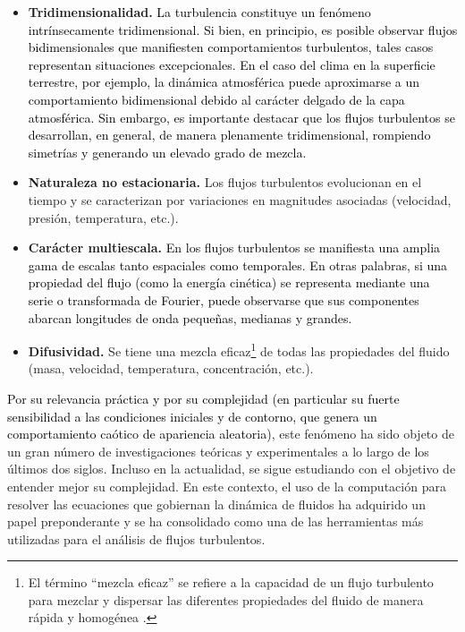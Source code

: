 \begin{itemize}
	
	
	
\item \textbf{Tridimensionalidad.} \textcolor{black}{La turbulencia constituye un fenómeno intrínsecamente tridimensional. Si bien, en principio, es posible observar flujos bidimensionales que manifiesten comportamientos turbulentos, tales casos representan situaciones excepcionales. En el caso del clima en la superficie terrestre, por ejemplo, la dinámica atmosférica puede aproximarse a un comportamiento bidimensional debido al carácter delgado de la capa atmosférica. Sin embargo, es importante destacar que los flujos turbulentos se desarrollan, en general, de manera plenamente tridimensional, rompiendo simetrías y generando un elevado grado de mezcla.}
	
	
	\item \textbf{Naturaleza no estacionaria.} Los flujos turbulentos evolucionan en el tiempo y se caracterizan por variaciones en magnitudes asociadas (velocidad, presión, temperatura, etc.).
	
	
	\item \textbf{Carácter multiescala.} \textcolor{black}{En los flujos turbulentos se manifiesta una amplia gama de escalas tanto espaciales como temporales. En otras palabras, si una propiedad del flujo (como la energía cinética) se representa mediante una serie o transformada de Fourier, puede observarse que sus componentes abarcan longitudes de onda pequeñas, medianas y grandes.}
	
	\item \textbf{Difusividad.} Se tiene una mezcla eficaz\footnote{El término ``mezcla eficaz'' se refiere a la capacidad de un flujo turbulento para mezclar y dispersar las diferentes propiedades del fluido de manera rápida y homogénea \cite{pope2001turbulent}.} de todas las propiedades del fluido (masa, velocidad, temperatura, concentración, etc.).

\end{itemize}

\textcolor{black}{Por su relevancia práctica y por su complejidad (en particular su fuerte sensibilidad a las condiciones iniciales y de contorno, que genera un comportamiento caótico de apariencia aleatoria)}, este fenómeno ha sido objeto de un gran número de investigaciones teóricas y experimentales a lo largo de los últimos dos siglos. Incluso en la actualidad, se sigue estudiando con el objetivo de entender mejor su complejidad. En este contexto, el uso de la computación para resolver las ecuaciones que gobiernan la dinámica de fluidos ha adquirido un papel preponderante y se ha consolidado como una de las herramientas más utilizadas para el análisis de flujos turbulentos.

